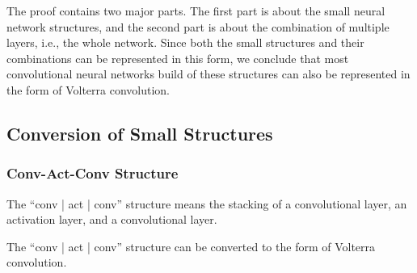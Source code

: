 \documentclass[twoside,11pt]{article}
\begin{document}
The proof contains two major parts. The first part is about the small neural network structures, and the second part is about the combination of multiple layers, i.e., the whole network.
Since both the small structures and their combinations can be represented in this form, we conclude that most convolutional neural networks build of these structures can also be represented in the form of Volterra convolution.

\subsection{Conversion of Small Structures}

\subsubsection{Conv-Act-Conv Structure}
\label{subsubsec:combine-layers}

The ``conv | act | conv'' structure means the stacking of a convolutional layer, an activation layer, and a convolutional layer.

\begin{lemma}
  The ``conv | act | conv'' structure can be converted to the form of Volterra convolution. %
  \label{lemma:convolution-with-activation-is-Volterra}
\end{lemma}
\end{document}

